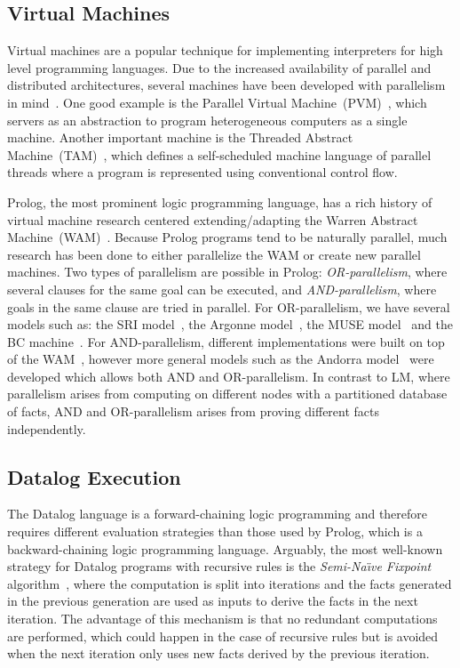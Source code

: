 \subsection{Virtual Machines}

Virtual machines are a popular technique for implementing interpreters for high
level programming languages. Due to the increased availability of parallel and
distributed architectures, several machines have been developed with parallelism
in mind~\cite{Kara:1997:AMM:265274}. One good example is the Parallel Virtual
Machine~(PVM)~\cite{Sunderam90pvm:a}, which servers as an abstraction to program
heterogeneous computers as a single machine. Another important machine is the
Threaded Abstract Machine~(TAM)~\cite{CullerGSvE93,goldstein-tr94}, which
defines a self-scheduled machine language of parallel threads where a program is
represented using conventional control flow.

Prolog, the most prominent logic programming language, has a rich history of
virtual machine research centered extending/adapting the Warren Abstract
Machine~(WAM)~\cite{AICPub641:1983}.  Because Prolog programs tend to be
naturally parallel, much research has been done to either parallelize the WAM or
create new parallel machines. Two types of parallelism are possible in Prolog:
\emph{OR-parallelism}, where several clauses for the same goal can be executed,
and \emph{AND-parallelism}, where goals in the same clause are tried in
parallel. For OR-parallelism, we have several models such as: the SRI
model~\cite{Warren:1987:OEM:67683.67699}, the Argonne
model~\cite{ButlerDLOOS88}, the MUSE model~\cite{Ali:1990fk} and the BC
machine~\cite{Ali88}. For AND-parallelism, different implementations were built
on top of the WAM~\cite{Hermenegildo:1986:AMB:913061,Lin:1988:AEL:900478},
however more general models such as the Andorra
model~\cite{Haridi:1990:KAP:87961.87964} were developed which allows both AND
and OR-parallelism. In contrast to LM, where parallelism arises from computing
on different nodes with a partitioned database of facts, AND and OR-parallelism
arises from proving different facts independently.

\subsection{Datalog Execution}

The Datalog language is a forward-chaining logic programming and therefore
requires different evaluation strategies than those used by Prolog, which is a
backward-chaining logic programming language.  Arguably, the most well-known
strategy for Datalog programs with recursive rules is the \emph{Semi-Na\"{\i}ve
Fixpoint} algorithm~\cite{Balbin:1987:GDA:34657.34661}, where the computation is
split into iterations and the facts generated in the previous generation are
used as inputs to derive the facts in the next iteration. The advantage of this
mechanism is that no redundant computations are performed, which could happen in
the case of recursive rules but is avoided when the next iteration only uses new
facts derived by the previous iteration.
   
